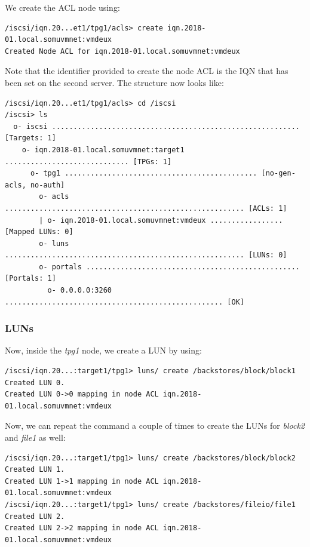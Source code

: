 \noindent
We create the ACL node using:

\vspace{-15pt}
\begin{verbatim}
/iscsi/iqn.20...et1/tpg1/acls> create iqn.2018-01.local.somuvmnet:vmdeux
Created Node ACL for iqn.2018-01.local.somuvmnet:vmdeux
\end{verbatim}
\vspace{-10pt}

\noindent
Note that the identifier provided to create the node ACL is the IQN that has been set on the second server. The structure now looks like:

\vspace{-15pt}
\begin{verbatim}
/iscsi/iqn.20...et1/tpg1/acls> cd /iscsi
/iscsi> ls
  o- iscsi .......................................................... [Targets: 1]
    o- iqn.2018-01.local.somuvmnet:target1 ............................. [TPGs: 1]
      o- tpg1 ............................................. [no-gen-acls, no-auth]
        o- acls ........................................................ [ACLs: 1]
        | o- iqn.2018-01.local.somuvmnet:vmdeux ................. [Mapped LUNs: 0]
        o- luns ........................................................ [LUNs: 0]
        o- portals .................................................. [Portals: 1]
          o- 0.0.0.0:3260 ................................................... [OK]
\end{verbatim}
\vspace{-10pt}

\subsubsection{LUNs}
\vspace{-10pt}
Now, inside the \textit{tpg1} node, we create a LUN by using:

\vspace{-15pt}
\begin{verbatim}
/iscsi/iqn.20...:target1/tpg1> luns/ create /backstores/block/block1
Created LUN 0.
Created LUN 0->0 mapping in node ACL iqn.2018-01.local.somuvmnet:vmdeux
\end{verbatim}
\vspace{-10pt}

\noindent
Now, we can repeat the command a couple of times to create the LUNs for \textit{block2} and \textit{file1} as well:

\vspace{-15pt}
\begin{verbatim}
/iscsi/iqn.20...:target1/tpg1> luns/ create /backstores/block/block2
Created LUN 1.
Created LUN 1->1 mapping in node ACL iqn.2018-01.local.somuvmnet:vmdeux
/iscsi/iqn.20...:target1/tpg1> luns/ create /backstores/fileio/file1 
Created LUN 2.
Created LUN 2->2 mapping in node ACL iqn.2018-01.local.somuvmnet:vmdeux
\end{verbatim}
\vspace{-10pt}

